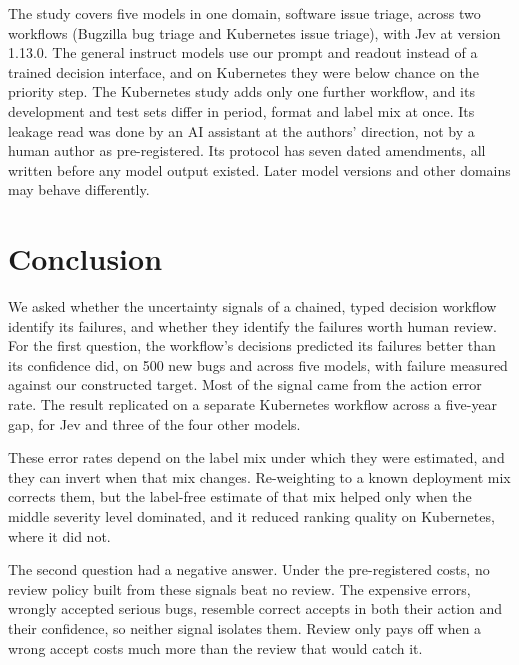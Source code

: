  The study covers five models in one domain,
software issue triage, across two workflows (Bugzilla bug triage and
Kubernetes issue triage), with Jev at version 1.13.0. The general
instruct models use our prompt and readout instead of a trained decision
interface, and on Kubernetes they were below chance on the priority
step. The Kubernetes study adds only one further workflow, and its
development and test sets differ in period, format and label mix at once.
Its leakage read was done by an AI assistant at the authors' direction,
not by a human author as pre-registered. Its protocol has seven dated
amendments, all written before any model output existed. Later
model versions and other domains may behave differently.

\section{Conclusion}
\label{sec:conclusion}

We asked whether the uncertainty signals of a chained, typed decision
workflow identify its failures, and whether they identify the failures
worth human review. For the first question, the workflow's decisions
predicted its failures better than its confidence did, on 500 new bugs and
across five models, with failure measured against our constructed target.
Most of the signal came from the action error rate. The result replicated on a separate Kubernetes workflow
across a five-year gap, for Jev and three of the four other models.

These error rates depend on the label mix under which they were
estimated, and they can invert when that mix changes. Re-weighting to a
known deployment mix corrects them, but the label-free estimate of that
mix helped only when the middle severity level dominated, and it reduced
ranking quality on Kubernetes, where it did not.

The second question had a negative answer. Under the pre-registered
costs, no review policy built from these signals beat no review. The
expensive errors, wrongly accepted serious bugs, resemble correct accepts
in both their action and their confidence, so neither signal isolates
them. Review only pays off when a wrong accept costs much more than the
review that would catch it.

